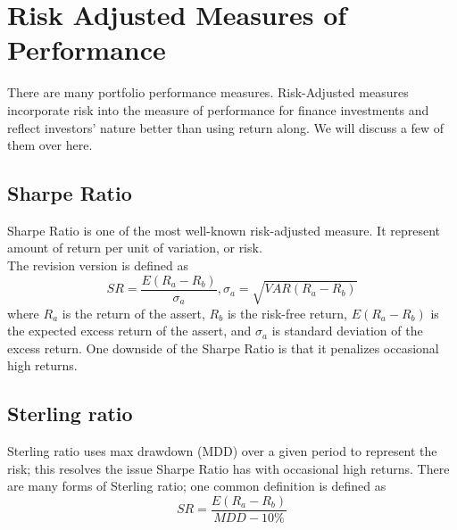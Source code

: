 \section{Risk Adjusted Measures of Performance}
There are many portfolio performance measures.\cite{cogneau2009101,cogneau2009more,cogneau2009more2}
Risk-Adjusted measures incorporate risk into the measure of performance for finance investments and reflect investors' nature better than using return along.
We will discuss a few of them over here.
\subsection{Sharpe Ratio}
Sharpe Ratio\cite{Sharpe49} is one of the most well-known risk-adjusted measure. It represent amount of return per unit of variation, or risk.\\
The revision version is defined as
\[ SR = \frac{E(R_a - R_b)}{\sigma_a},
\sigma_a = \sqrt{VAR(R_a-R_b)}\]
where \(R_a\) is the return of the assert, 
\(R_b\) is the risk-free return,
\(E(R_a - R_b)\) is the expected excess return of the assert,
and \(\sigma_a\) is standard deviation of the excess return.
One downside of the Sharpe Ratio is that it penalizes occasional high returns.\cite{9206647}
\subsection{Sterling ratio}
Sterling ratio\cite{magdon2004maximum} uses max drawdown (MDD) over a given period to represent the risk; this resolves the issue Sharpe Ratio has with occasional high returns. 
There are many forms of Sterling ratio; one common definition\cite{magdon2004maximum} is defined as 
\[ SR = \frac{E(R_a - R_b)}{MDD - 10\%}\]
